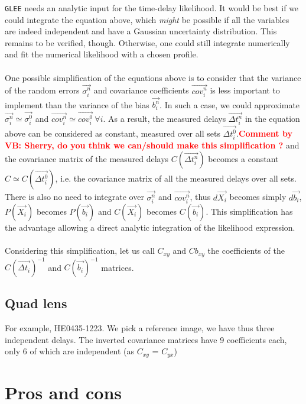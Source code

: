 \documentclass[11pt]{scrartcl}
\newcommand{\com}[2]{\xspace\textcolor{red}{\textbf{Comment by #1: #2}}}
\renewcommand{\vec}{\overrightarrow}  %
\begin{document}
\texttt{GLEE} needs an analytic input for the time-delay likelihood. It 
would be best if we could integrate the equation above, which 
\emph{might} be possible if all the variables are indeed independent 
and have a Gaussian uncertainty distribution. This remains to be 
verified, though. Otherwise, one could still integrate numerically and 
fit the numerical likelihood with a chosen profile.\\
\\
One possible simplification of the equations above is to consider that 
the variance of the random errors $\vec{\sigma^n_i}$ and covariance 
coefficients $\vec{cov^n_i}$ is less important to implement than the 
variance of the bias $\vec{b^n_i}$. In such a case, we could 
approximate $\vec{\sigma^n_i} \simeq \vec{\sigma^0_i}$ and 
$\vec{cov^n_i} \simeq \vec{cov^0_i} \ \forall i$. As a result, the 
measured delays $\vec{\Delta 
t_i^n}$ in the equation above can be considered as constant, measured 
over all sets $\vec{\Delta 
t_i^0}$.\com{VB}{Sherry, do you think we can/should make this 
simplification ?} and the 
covariance matrix of the measured delays $C(\vec{\Delta 
t_i^n})$ becomes a constant $C \simeq C(\vec{\Delta 
t^0_i})$, i.e. the covariance matrix of all the measured delays over 
all sets. There is also no need to integrate over $\vec{\sigma^n_i}$ 
and $\vec{cov^n_i}$, thus $d\vec{X_i}$ becomes simply $d\vec{b_i}$, 
$P(\vec{X_i})$ becomes $P(\vec{b_i})$ and $C(\vec{X_i})$ becomes 
$C(\vec{b_i})$. This simplification has the advantage allowing a direct 
analytic integration of the likelihood expression.   \\
\\
Considering this simplification, let us call $C_{xy}$ and $Cb_{xy}$ 
the coefficients of the $C(\vec{\Delta 
t_i})^{-1}$ and $C(\vec{b_i})^{-1}$ matrices.

\subsection{Quad lens}

For example, HE0435-1223. We pick a reference image, we have thus three 
independent delays. The inverted covariance matrices have 9 
coefficients each, only 6 of which are independent (as $C_{xy}$ = 
$C_{yx}$)


\section{Pros and cons}
\end{document}
